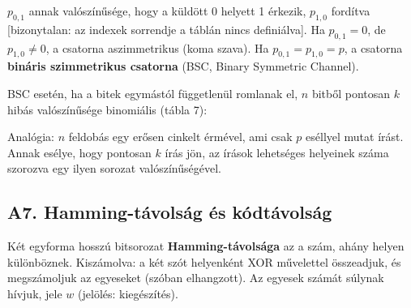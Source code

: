 \begin{center}
\end{center}

$p_{0,1}$ annak valószínűsége, hogy a küldött 0 helyett 1 érkezik, $p_{1,0}$ fordítva [bizonytalan: az indexek sorrendje a táblán nincs definiálva]. Ha $p_{0,1}=0$, de $p_{1,0}\ne 0$, a csatorna aszimmetrikus (koma szava). Ha $p_{0,1}=p_{1,0}=p$, a csatorna \textbf{bináris szimmetrikus csatorna} (BSC, Binary Symmetric Channel).

BSC esetén, ha a bitek egymástól függetlenül romlanak el, $n$ bitből pontosan $k$ hibás valószínűsége binomiális (tábla 7):

\begin{center}\end{center}

Analógia: $n$ feldobás egy erősen cinkelt érmével, ami csak $p$ eséllyel mutat írást. Annak esélye, hogy pontosan $k$ írás jön, az írások lehetséges helyeinek száma szorozva egy ilyen sorozat valószínűségével.

\subsection{\texorpdfstring{A7. Hamming-távolság és kódtávolság}{A7. Hamming-távolság és kódtávolság}}\label{a6-hamming}
Két egyforma hosszú bitsorozat \textbf{Hamming-távolsága} az a szám, ahány helyen különböznek. Kiszámolva: a két szót helyenként XOR művelettel összeadjuk, és megszámoljuk az egyeseket (szóban elhangzott). Az egyesek számát súlynak hívjuk, jele $w$ (jelölés: kiegészítés).

